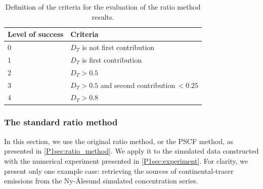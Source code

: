         \begin{table}[t]
            \centering
            \caption{Definition of the criteria for the evaluation of the ratio method results.}

            \begin{tabular}{ll}
                \toprule
                \textbf{Level of success} & \textbf{Criteria} \\
                \midrule
                0 & $D_{T}$ is not first contribution \\
                1 & $D_{T}$ is first contribution \\
                2 & $D_{T} > 0.5$ \\
                3 & $D_{T} > 0.5$ and second contribution\,$< 0.25$\\
                4 & $D_{T} > 0.8$ \\
                \bottomrule
            \end{tabular}
            \label{P1tab:success_criteria}
        \end{table}

    \subsubsection{The standard ratio method}
        \label{P1sec:standard_method}

        In this section, we use the original ratio method, or the PSCF method, as presented in \cref{P1sec:ratio_method}.
        We apply it to the simulated data constructed with the numerical experiment presented in \cref{P1sec:experiment}.
        For clarity, we present only one example case: retrieving the sources of continental-tracer emissions from the Ny-Ålesund simulated concentration series.

